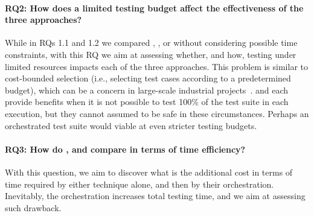 \paragraph{RQ2: How does a limited testing budget affect the effectiveness of the three approaches?}
While in RQs 1.1 and 1.2 we compared \ek, \fs, or \fz without considering possible time constraints, with this RQ we aim at assessing whether, and how, testing under limited resources impacts each of the three approaches. 
This problem is similar to cost-bounded selection \cite{cibulski2011regression} (i.e., selecting
test cases according to a predetermined budget), which can be a concern in large-scale industrial projects~\cite{elbaum2014techniques}. 
\tcs and \tcp each provide benefits when it is not possible to test 100\% of the test suite in each execution, but they cannot assumed to be safe in these circumstances.
Perhaps an orchestrated test suite would viable at even stricter testing budgets.

\paragraph{RQ3: How do \ek, \fs and \fz compare in terms of time efficiency?}
With this question, we aim to discover what is the additional cost in terms of time required by either technique alone, and then by their orchestration.
Inevitably, the orchestration increases total testing time, and we aim at assessing such drawback.
